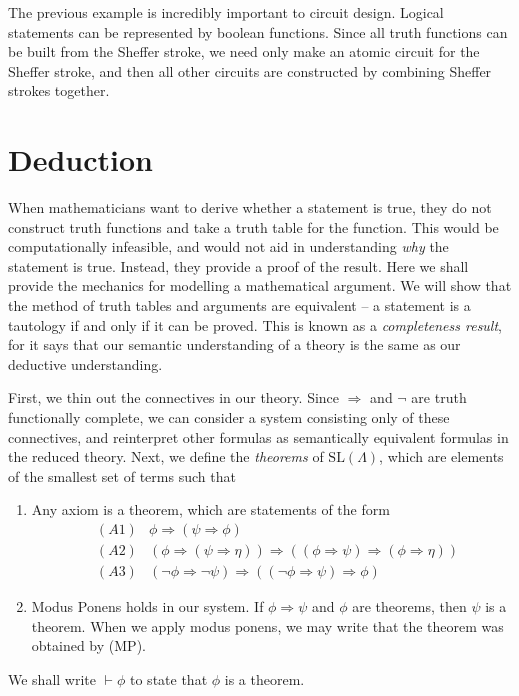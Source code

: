 The previous example is incredibly important to circuit design. Logical statements can be represented by boolean functions. Since all truth functions can be built from the Sheffer stroke, we need only make an atomic circuit for the Sheffer stroke, and then all other circuits are constructed by combining Sheffer strokes together.




\section{Deduction}

When mathematicians want to derive whether a statement is true, they do not construct truth functions and take a truth table for the function. This would be computationally infeasible, and would not aid in understanding {\it why} the statement is true. Instead, they provide a proof of the result. Here we shall provide the mechanics for modelling a mathematical argument. We will show that the method of truth tables and arguments are equivalent -- a statement is a tautology if and only if it can be proved. This is known as a {\it completeness result}, for it says that our semantic understanding of a theory is the same as our deductive understanding.

First, we thin out the connectives in our theory. Since $\Rightarrow$ and $\neg$ are truth functionally complete, we can consider a system consisting only of these connectives, and reinterpret other formulas as semantically equivalent formulas in the reduced theory. Next, we define the \emph{theorems} of $\text{SL}(\Lambda)$, which are elements of the smallest set of terms such that
    \begin{enumerate}
        \item Any axiom is a theorem, which are statements of the form
        \begin{align*}
            &(A1) & \phi \Rightarrow (\psi \Rightarrow \phi)\\
            &(A2) & (\phi \Rightarrow (\psi \Rightarrow \eta)) \Rightarrow ((\phi \Rightarrow \psi) \Rightarrow (\phi \Rightarrow \eta))\\
            &(A3) & (\neg \phi \Rightarrow \neg \psi) \Rightarrow ((\neg \phi \Rightarrow \psi) \Rightarrow \phi)
        \end{align*}
        \item Modus Ponens holds in our system. If $\phi \Rightarrow \psi$ and $\phi$ are theorems, then $\psi$ is a theorem. When we apply modus ponens, we may write that the theorem was obtained by (MP).
    \end{enumerate}
We shall write $\vdash \phi$ to state that $\phi$ is a theorem.

